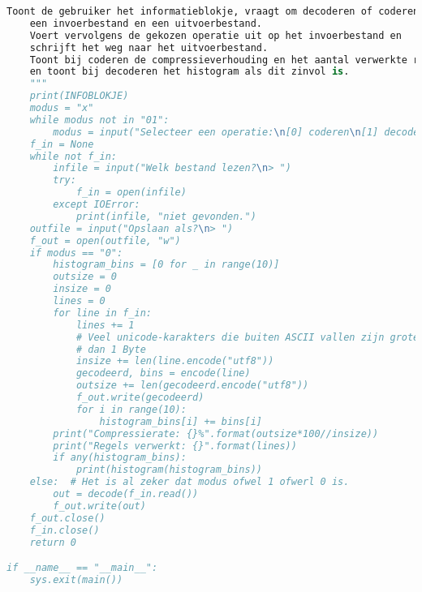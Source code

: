 \documentclass{article}
\begin{document}
\begin{lstlisting}[frame=single, language=python]
    Toont de gebruiker het informatieblokje, vraagt om decoderen of coderen,
    een invoerbestand en een uitvoerbestand.
    Voert vervolgens de gekozen operatie uit op het invoerbestand en
    schrijft het weg naar het uitvoerbestand.
    Toont bij coderen de compressieverhouding en het aantal verwerkte regels
    en toont bij decoderen het histogram als dit zinvol is.
    """
    print(INFOBLOKJE)
    modus = "x"
    while modus not in "01":
        modus = input("Selecteer een operatie:\n[0] coderen\n[1] decoderen\n> ")
    f_in = None
    while not f_in:
        infile = input("Welk bestand lezen?\n> ")
        try:
            f_in = open(infile)
        except IOError:
            print(infile, "niet gevonden.")
    outfile = input("Opslaan als?\n> ")
    f_out = open(outfile, "w")
    if modus == "0":
        histogram_bins = [0 for _ in range(10)]
        outsize = 0
        insize = 0
        lines = 0
        for line in f_in:
            lines += 1
            # Veel unicode-karakters die buiten ASCII vallen zijn groter
            # dan 1 Byte
            insize += len(line.encode("utf8"))
            gecodeerd, bins = encode(line)
            outsize += len(gecodeerd.encode("utf8"))
            f_out.write(gecodeerd)
            for i in range(10):
                histogram_bins[i] += bins[i]
        print("Compressierate: {}%".format(outsize*100//insize))
        print("Regels verwerkt: {}".format(lines))
        if any(histogram_bins):
            print(histogram(histogram_bins))
    else:  # Het is al zeker dat modus ofwel 1 ofwerl 0 is.
        out = decode(f_in.read())
        f_out.write(out)
    f_out.close()
    f_in.close()
    return 0

if __name__ == "__main__":
    sys.exit(main())

 \end{lstlisting}
\end{document}
